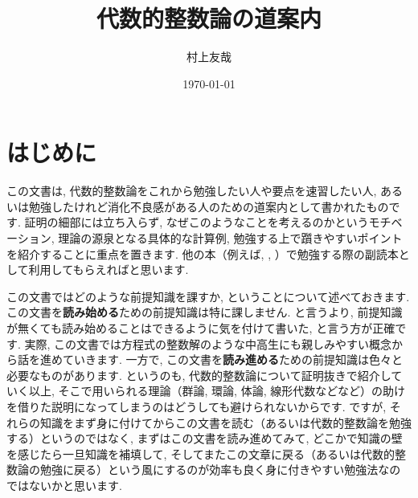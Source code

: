 \documentclass[11pt,b5paper,oneside,titlepage,lualatex]{ltjsreport}
\numberwithin{equation}{section} %
\begin{document}

\title{代数的整数論の道案内}
\author{村上友哉}
\date{\today}
\maketitle



\chapter*{はじめに} \label{chap:intro}


この文書は, 代数的整数論をこれから勉強したい人や要点を速習したい人, あるいは勉強したけれど消化不良感がある人のための道案内として書かれたものです. 
証明の細部には立ち入らず, なぜこのようなことを考えるのかというモチベーション, 理論の源泉となる具体的な計算例, 勉強する上で躓きやすいポイントを紹介することに重点を置きます. 
他の本（例えば\cite{Yukie1}, \cite{Yukie2}, \cite{Neu}）で勉強する際の副読本として利用してもらえればと思います. 

この文書ではどのような前提知識を課すか, ということについて述べておきます. 
この文書を\textbf{読み始める}ための前提知識は特に課しません. 
と言うより, 前提知識が無くても読み始めることはできるように気を付けて書いた, と言う方が正確です. 
実際, この文書では方程式の整数解のような中高生にも親しみやすい概念から話を進めていきます. 
一方で, この文書を\textbf{読み進める}ための前提知識は色々と必要なものがあります. 
というのも, 代数的整数論について証明抜きで紹介していく以上, そこで用いられる理論（群論, 環論, 体論, 線形代数などなど）の助けを借りた説明になってしまうのはどうしても避けられないからです. 
ですが, それらの知識をまず身に付けてからこの文書を読む（あるいは代数的整数論を勉強する）というのではなく, まずはこの文書を読み進めてみて, どこかで知識の壁を感じたら一旦知識を補填して, そしてまたこの文章に戻る（あるいは代数的整数論の勉強に戻る）という風にするのが効率も良く身に付きやすい勉強法なのではないかと思います. 


\begin{quote}
	\centering
	[工事中]
\end{quote}


\end{document}
